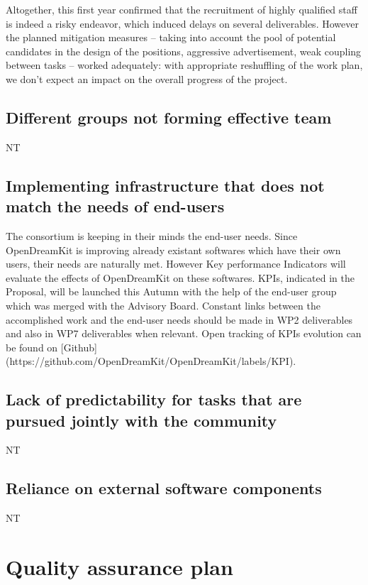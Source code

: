 \documentclass{deliverablereport}
\begin{document}
Altogether, this first year confirmed that the recruitment of highly
qualified staff is indeed a risky endeavor, which induced delays on
several deliverables. However the planned mitigation measures --
taking into account the pool of potential candidates in the design of
the positions, aggressive advertisement, weak coupling between tasks
-- worked adequately: with appropriate reshuffling of the work plan,
we don't expect an impact on the overall progress of the project.

\subsection{Different groups not forming effective team}
NT
\subsection{Implementing infrastructure that does not match the needs of end-users}

The consortium is keeping in their minds the end-user needs. Since OpenDreamKit is improving already existant softwares which have their own users, their needs are naturally met. However Key performance Indicators will evaluate the effects of OpenDreamKit on these softwares. KPIs, indicated in the Proposal, will be launched this Autumn with the help of the end-user group which was merged with the Advisory Board. Constant links between the accomplished work and the end-user needs should be made in WP2 deliverables and also in WP7 deliverables when relevant.
Open tracking of KPIs evolution can be found on [Github](https://github.com/OpenDreamKit/OpenDreamKit/labels/KPI).

\subsection{Lack of predictability for tasks that are pursued jointly with the community}
NT
\subsection{Reliance on external software components}
NT

\section{Quality assurance plan}
\end{document}
